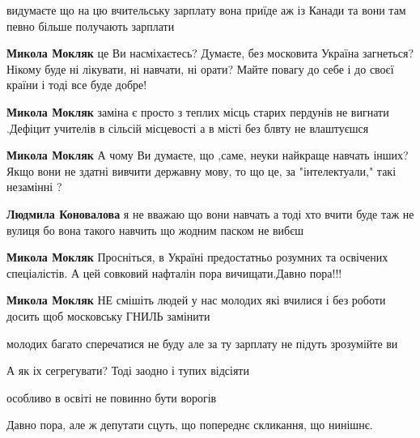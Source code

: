 \begin{itemize}
\begin{itemize}
\begin{itemize}
\end{itemize} %

видумаєте що на цю вчительську зарплату вона приїде аж із Канади та вони там певно більше получають зарплати

\textbf{Микола Мокляк} це Ви насміхаєтесь? Думаєте, без московита Україна загнеться? Нікому буде ні лікувати, ні навчати, ні орати? Майте повагу до себе і до своєї країни і тоді все буде добре!

\textbf{Микола Мокляк} заміна є просто з теплих місць старих пердунів не вигнати .Дефіцит учителів в сільсій місцевості а в місті без блвту не влаштуєшся

\textbf{Микола Мокляк} А чому Ви думаєте, що ,саме, неуки найкраще навчать інших? Якщо вони не здатні вивчити державну мову, то що це, за "інтелектуали," такі незамінні ?

\begin{itemize} %
\textbf{Людмила Коновалова} я не вважаю що вони навчать а тоді хто вчити буде таж не вулиця бо вона такого навчить що жодним паском не вибєш

\textbf{Микола Мокляк} Просніться, в Україні предостатньо розумних та освічених спеціалістів. А цей совковий нафталін пора вичищати.Давно пора!!!
\end{itemize} %

\textbf{Микола Мокляк} НЕ смішіть людей у нас молодих які вчилися і без роботи досить щоб московську ГНИЛЬ замінити

молодих багато сперечатися не буду але за ту зарплату не підуть зрозумійте ви

\end{itemize} %

А як іх сегрегувати? Тоді заодно і тупих відсіяти

особливо в освіті не повинно бути ворогів

Давно пора, але ж депутати сцуть, що попереднє скликання, що нинішнє.


\end{itemize} %
